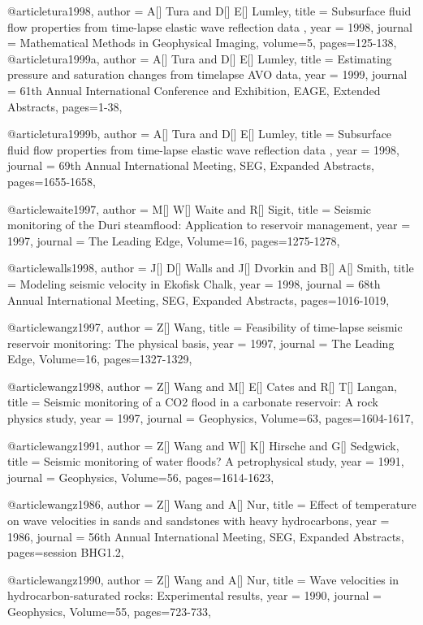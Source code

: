 @article{tura1998,
  author =	 {A[] Tura and D[] E[] Lumley},
  title =	 { Subsurface fluid flow properties from time-lapse elastic wave reflection data },
  year =	 1998,
  journal =	 {Mathematical Methods in Geophysical Imaging},
  volume=5,
 pages=125-138,
}
@article{tura1999a,
  author =	 {A[] Tura and D[] E[] Lumley},
  title =	 {Estimating pressure and saturation changes from timelapse AVO data},
  year =	 1999,
  journal =	 {61th Annual International Conference and Exhibition, EAGE, Extended Abstracts},
 pages=1-38,
}

@article{tura1999b,
  author =	 {A[] Tura and D[] E[] Lumley},
  title =	 { Subsurface fluid flow properties from time-lapse elastic wave reflection data },
  year =	 1998,
 journal =	 {69th Annual International Meeting, SEG, Expanded Abstracts},
 pages=1655-1658,
}

@article{waite1997,
  author =	 {M[] W[] Waite and R[] Sigit},
  title =	 {Seismic monitoring of the Duri steamflood: Application to reservoir management},
  year =	 1997,
  journal =	 {The Leading Edge},
    Volume=16,
 pages=1275-1278,
}

@article{walls1998,
  author =	 {J[] D[] Walls and J[] Dvorkin and B[] A[] Smith},
  title =	 {Modeling seismic velocity in Ekofisk Chalk},
  year =	 1998,
 journal =	 {68th Annual International Meeting, SEG, Expanded Abstracts},
 pages=1016-1019,
}

@article{wangz1997,
  author =	 {Z[] Wang},
  title =	 {Feasibility of time-lapse seismic reservoir monitoring:
The physical basis},
  year =	 1997,
  journal =	 {The Leading Edge},
    Volume=16,
 pages=1327-1329,
}

@article{wangz1998,
  author =	 {Z[] Wang and M[] E[] Cates and R[] T[] Langan},
  title =	 {Seismic monitoring of a CO2 flood in a carbonate reservoir: A rock physics study},
  year =	 1997,
  journal =	 {Geophysics},
    Volume=63,
 pages=1604-1617,
}

@article{wangz1991,
  author =	 {Z[] Wang and W[] K[] Hirsche and G[] Sedgwick},
  title =	 {Seismic monitoring of water floods? A petrophysical study},
  year =	 1991,
  journal =	 {Geophysics},
    Volume=56,
 pages=1614-1623,
}

@article{wangz1986,
  author =	 {Z[] Wang and A[] Nur},
  title =	 {Effect of temperature on wave velocities in
sands and sandstones with heavy hydrocarbons},
  year =	 1986,
 journal =	 {56th Annual International Meeting, SEG, Expanded Abstracts},
 pages=session BHG1.2,
}

@article{wangz1990,
  author =	 {Z[] Wang and A[] Nur},
  title =	 {Wave velocities in hydrocarbon-saturated rocks: Experimental results},
  year =	 1990,
  journal =	 {Geophysics},
    Volume=55,
 pages=723-733,
}


